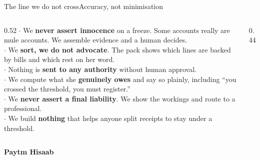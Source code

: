 \documentclass[aspectratio=169,10pt]{beamer}
\newcommand{\hi}[1]{{\color{navy}\bfseries #1}}
\newcommand{\qm}[1]{``#1''}
\begin{document}
\begin{frame}{The line we do not cross}{Accuracy, not minimisation}
\vspace{0.3cm}
\begin{columns}[T]
\begin{column}{0.52\textwidth}
{\scriptsize
$\cdot$\; We \hi{never assert innocence} on a freeze. Some accounts really are mule accounts. We assemble evidence and a human decides.\\[0.5em]
$\cdot$\; We \hi{sort, we do not advocate}. The pack shows which lines are backed by bills and which rest on her word.\\[0.5em]
$\cdot$\; Nothing is \hi{sent to any authority} without human approval.\\[0.5em]
$\cdot$\; We compute what she \hi{genuinely owes} and say so plainly, including \qm{you crossed the threshold, you must register.}\\[0.5em]
$\cdot$\; We \hi{never assert a final liability}. We show the workings and route to a professional.\\[0.5em]
$\cdot$\; We build \hi{nothing} that helps anyone split receipts to stay under a threshold.}
\end{column}
\begin{column}{0.44\textwidth}
\end{column}
\end{columns}
\vspace{0.4cm}
\begin{center}
{\large\color{navy}\bfseries Paytm Hisaab}
\end{center}
\end{frame}
\end{document}
